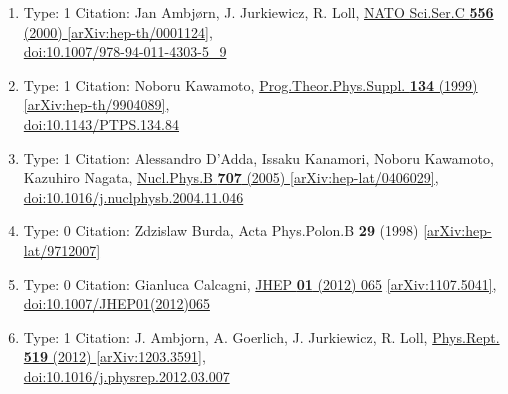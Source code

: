 \documentclass[a4paper,10pt]{article}
\begin{document}
\begin{enumerate}
\begin{enumerate}
  \item Type: 1 Citation: Jan Ambjørn, J. Jurkiewicz, R. Loll, \href{https://www.doi.org/10.1007/978-94-011-4303-5_9}{NATO Sci.Ser.C {\bf 556} (2000) }  \href{https://arxiv.org/abs/hep-th/0001124}{[arXiv:hep-th/0001124]},\\\href{https://www.doi.org/10.1007/978-94-011-4303-5_9}{doi:10.1007/978-94-011-4303-5\_9}
  \item Type: 1 Citation: Noboru Kawamoto, \href{https://www.doi.org/10.1143/PTPS.134.84}{Prog.Theor.Phys.Suppl. {\bf 134} (1999) }  \href{https://arxiv.org/abs/hep-th/9904089}{[arXiv:hep-th/9904089]},\\\href{https://www.doi.org/10.1143/PTPS.134.84}{doi:10.1143/PTPS.134.84}
  \item Type: 1 Citation: Alessandro D'Adda, Issaku Kanamori, Noboru Kawamoto, Kazuhiro Nagata, \href{https://www.doi.org/10.1016/j.nuclphysb.2004.11.046}{Nucl.Phys.B {\bf 707} (2005) }  \href{https://arxiv.org/abs/hep-lat/0406029}{[arXiv:hep-lat/0406029]},\\\href{https://www.doi.org/10.1016/j.nuclphysb.2004.11.046}{doi:10.1016/j.nuclphysb.2004.11.046}
  \item Type: 0 Citation: Zdzislaw Burda, Acta Phys.Polon.B {\bf 29} (1998)   \href{https://arxiv.org/abs/hep-lat/9712007}{[arXiv:hep-lat/9712007]}
  \item Type: 0 Citation: Gianluca Calcagni, \href{https://www.doi.org/10.1007/JHEP01(2012)065}{JHEP {\bf 01} (2012) 065}  \href{https://arxiv.org/abs/1107.5041}{[arXiv:1107.5041]},\\\href{https://www.doi.org/10.1007/JHEP01(2012)065}{doi:10.1007/JHEP01(2012)065}
  \item Type: 1 Citation: J. Ambjorn, A. Goerlich, J. Jurkiewicz, R. Loll, \href{https://www.doi.org/10.1016/j.physrep.2012.03.007}{Phys.Rept. {\bf 519} (2012) }  \href{https://arxiv.org/abs/1203.3591}{[arXiv:1203.3591]},\\\href{https://www.doi.org/10.1016/j.physrep.2012.03.007}{doi:10.1016/j.physrep.2012.03.007}

\end{enumerate}
\end{enumerate}
\end{document}
